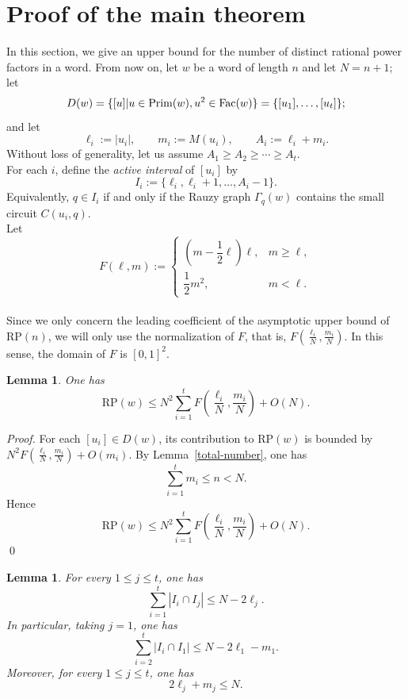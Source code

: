 \documentclass[runningheads,envcountsame,a4paper]{llncs}
\newtheorem{lem}[thm]{Lemma}
\newcommand{\fac}{\hbox{\rm Fac}}
\newcommand{\pri}{\mathrm{Prim}}
\newcommand{\rp}{\mathrm{RP}}
\begin{document}
\section{Proof of the main theorem}\label{sec4}
In this section, we give an upper bound for the number of distinct rational power factors in a word. From now on, let $w$ be a word of length $n$ and let $N=n+1$;\\
let
\[
        D(w)=\{[u]|u\in\pri(w),u^2\in\fac(w)\}=\{[u_1],\ldots,[u_t]\};
\]
and let
\[
        \ell_i:=|u_i|,\qquad m_i:=M(u_i),\qquad A_i:=\ell_i+m_i.
\]
Without loss of generality, let us assume $A_1\ge A_2\ge\cdots\ge A_t$.\\
For each \(i\), define the {\em active interval} of \([u_i]\) by
\[
        I_i:=\{\ell_i,\ell_i+1,\ldots,A_i-1\}.
\]
Equivalently, \(q\in I_i\) if and only if the Rauzy graph \(\Gamma_q(w)\)
contains the small circuit \(C(u_i,q)\).\\
Let
\[
F(\ell,m):=
\begin{cases}
\left(m-\dfrac12\ell\right)\ell,& m\ge \ell,\\[1ex]
\dfrac12 m^2,& m<\ell.
\end{cases}
\]\\
Since we only concern the leading coefficient of the asymptotic upper bound of $\rp(n)$, we will only use the normalization of $F$, that is,  $F(\frac{\ell_i}{N},\frac{m_i}{N})$. In this sense, the domain of $F$ is $[0,1]^2$. 

\begin{lem}\label{estimation for RP in total}
One has 
$$\rp(w)\le N^2\sum_{i=1}^t F(\frac{\ell_i}{N},\frac{m_i}{N}) + O(N).$$ 
\end{lem}

\begin{proof}
For each $[u_i]\in D(w)$, its contribution
to $\rp(w)$ is bounded by $N^2F(\frac{\ell_i}{N},\frac{m_i}{N})+O(m_i)$. By Lemma~\ref{total-number}, one has
\begin{equation}\label{sum of M}
\sum_{i=1}^t m_i\le n<N.   
\end{equation}
Hence
$$\rp(w)\le N^2\sum_{i=1}^t F(\frac{\ell_i}{N},\frac{m_i}{N}) + O(N).$$ \qed
\end{proof}


\begin{lem}\label{lem:pivot-overlap}
For every \(1\le j\le t\), one has
\begin{equation}\label{lem9eq1}
\sum_{i=1}^t |I_i\cap I_j|\le N-2\ell_j .    
\end{equation}
In particular, taking \(j=1\), one has
\begin{equation}\label{lem9eq2}
\sum_{i=2}^t |I_i\cap I_1|\le N-2\ell_1-m_1 .    
\end{equation}
Moreover, for every \(1\le j\le t\), one has
\begin{equation}\label{lem9eq3}
2\ell_j+m_j\le N .    
\end{equation}
\end{lem}
\end{document}
